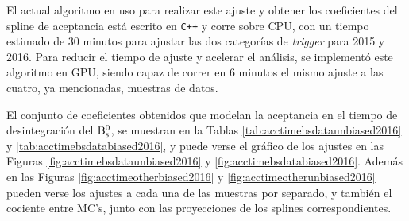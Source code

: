 El actual algoritmo en uso para realizar este ajuste y obtener los coeficientes del spline de aceptancia está escrito en \texttt{C++} y corre sobre CPU, con un tiempo estimado de 30 minutos para ajustar las dos categorías de \textit{trigger} para 2015 y 2016. Para reducir el tiempo de ajuste y acelerar el análisis, se implementó este algoritmo en GPU, siendo capaz de correr en 6 minutos el mismo ajuste a las cuatro, ya mencionadas, muestras de datos.

El conjunto de coeficientes obtenidos que modelan la aceptancia en el tiempo de desintegración del $\text{B}{}_{\text{s}}^{\text{0}}$,
 se muestran en la Tablas \ref{tab:acctimebsdataunbiased2016} y \ref{tab:acctimebsdatabiased2016}, y puede verse el gráfico de los ajustes en las Figuras \ref{fig:acctimebsdataunbiased2016} y \ref{fig:acctimebsdatabiased2016}. Además en las Figuras \ref{fig:acctimeotherbiased2016} y \ref{fig:acctimeotherunbiased2016} pueden verse los ajustes a cada una de las muestras por separado, y también el cociente entre MC's, junto con las proyecciones de los splines correspondientes.

